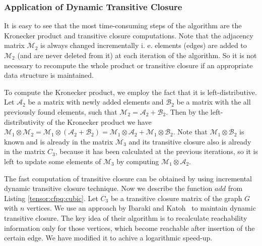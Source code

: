 \subsubsection{Application of Dynamic Transitive Closure}
It is easy to see that the most time-consuming steps of the algorithm are the Kronecker product and transitive closure computations.
Note that the adjacency matrix $\mathcal{M}_2$ is always changed incrementally i. e. elements (edges) are added to $\mathcal{M}_2$ (and are never deleted from it) at each iteration of the algorithm.
So it is not necessary to recompute the whole product or transitive closure if an appropriate data structure is maintained.


To compute the Kronecker product, we employ the fact that it is left-distributive.
Let $\mathcal{A}_2$ be a matrix with newly added elements and $\mathcal{B}_2$ be a matrix with the all previously found elements, such that $\mathcal{M}_2 = \mathcal{A}_2 + \mathcal{B}_2$.
Then by the left-distributivity of the Kronecker product we have $\mathcal{M}_1 \otimes \mathcal{M}_2 = \mathcal{M}_1 \otimes (\mathcal{A}_2 + \mathcal{B}_2) = \mathcal{M}_1\otimes \mathcal{A}_2 + \mathcal{M}_1 \otimes \mathcal{B}_2$.
Note that $\mathcal{M}_1 \otimes \mathcal{B}_2$ is known and is already in the matrix $\mathcal{M}_3$ and its transitive closure also is already in the matrix $C_3$, because it has been calculated at the previous iterations, so it is left to update some elements of $\mathcal{M}_3$ by computing $\mathcal{M}_1\otimes \mathcal{A}_2$.


The fast computation of transitive closure can be obtained by using incremental dynamic transitive closure technique. Now we describe the function $add$ from Listing \ref{tensor:cfpq:cubic}. Let $C_3$ be a transitive closure matrix of the graph $G$ with $n$ vertices. We use an approach by Ibaraki and Katoh~\cite{IBARAKI198395} to maintain dynamic transitive closure. The key idea of their algorithm is to recalculate reachability information only for those vertices, which become reachable after insertion of the certain edge. We have modified it to achive a logarithmic speed-up.


